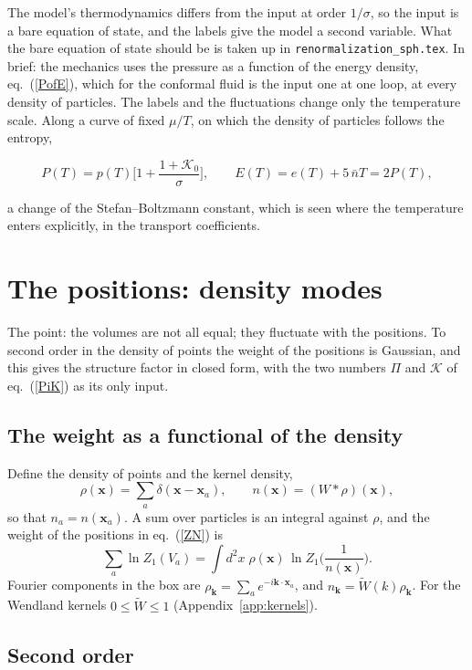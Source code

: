 \documentclass[11pt,aps,preprint,nofootinbib,superscriptaddress,tightenlines]{revtex4-2}
\def\st{\begin{equation}}
\def\stp{\end{equation}}
\def\Eq#1{eq.~(\ref{#1})}
\def\App#1{Appendix~\ref{#1}}
\begin{document}
The model's thermodynamics differs from the input at order $1/\sigma$, so the input is a bare equation of state, and the labels give the model a second
variable.  What the bare equation of state should be is taken up in \nolinkurl{renormalization_sph.tex}.  In brief: the mechanics uses the pressure as a function of the
energy density, \Eq{PofE}, which for the conformal fluid is the input one at one loop, at every density of particles.  The labels and the fluctuations change
only the temperature scale.  Along a curve of fixed $\mu/T$, on which the density of particles follows the entropy,
\begin{keyeq}
\st
P(T)=p(T)\Big[1+\frac{1+\mathcal K_0}\sigma\Big],\qquad E(T)=e(T)+5\,\bar nT=2P(T) ,
\label{Pconf}
\stp
\end{keyeq}
a change of the Stefan--Boltzmann constant, which is seen where the temperature enters explicitly, in the transport coefficients.

\section{The positions: density modes}
\label{sec:modes}

The point: the volumes are not all equal; they fluctuate with the positions.  To second order in the density of points the weight of the positions is
Gaussian, and this gives the structure factor in closed form, with the two numbers $\Pi$ and $\mathcal K$ of \Eq{PiK} as its only input.

\subsection{The weight as a functional of the density}
\label{sec:functional}

Define the density of points and the kernel density,
\st
\rho(\bm x)=\sum_a\delta(\bm x-\bm x_a),\qquad n(\bm x)=(W*\rho)(\bm x),
\stp
so that $n_a=n(\bm x_a)$.  A sum over particles is an integral against $\rho$, and the weight of the positions in \Eq{ZN} is
\st
\sum_a\ln Z_1(V_a)=\int d^2x\;\rho(\bm x)\,\ln Z_1\Big(\frac1{n(\bm x)}\Big) .
\stp
Fourier components in the box are $\rho_{\bm k}=\sum_ae^{-i\bm k\cdot\bm x_a}$, and $n_{\bm k}=\widetilde W(k)\rho_{\bm k}$.  For the Wendland kernels
$0\le\widetilde W\le1$ (\App{app:kernels}).

\subsection{Second order}
\label{sec:second}
\end{document}
